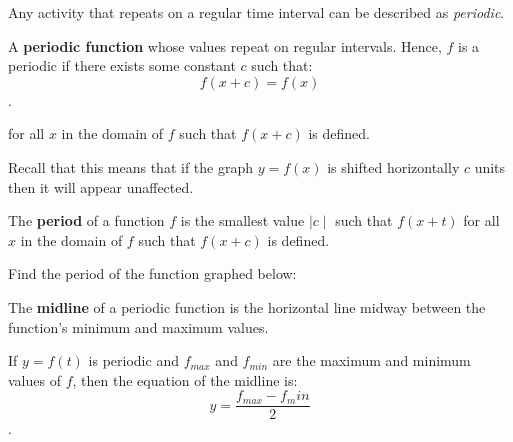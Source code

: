 \label{les_3:introduction_to_periodic_functions}

Any activity that repeats on a regular time interval can be described as
\textit{periodic}.

\begin{definition}
  \label{def:periodic_function}

  A \textbf{periodic function} whose values repeat on regular intervals. Hence,
  $f$ is a periodic if there exists some constant $c$ such that:
  \[ f(x + c) = f(x) \].

  for all $x$ in the domain of $f$ such that $f(x + c)$ is defined.

  Recall that this means that if the graph $y = f(x)$ is shifted horizontally $c$ 
  units then it will appear unaffected.
\end{definition}

\begin{definition}[Period]
  \label{def:period}

  The \textbf{period} of a function $f$ is the smallest value $\mid c \mid$ such
  that $f(x + t)$ for all $x$ in the domain of $f$ such that $f(x + c)$ is
  defined.
\end{definition}

\begin{exc}
  \label{exc:period}

  Find the period of the function graphed below:

  \begin{figure}[H]
    \centering


    \caption{}
    \label{fig:period}
  \end{figure}
\end{exc}

\begin{definition}[Midline]
  \label{def:midline}

  The \textbf{midline} of a periodic function is the horizontal line midway
  between the function's minimum and maximum values.

  If $y = f(t)$ is periodic and $f_{max}$ and $f_{min}$ are the maximum and
  minimum values of $f$, then the equation of the midline is:
  \[ y = \frac{f_{max} - f_min}{2} \].
\end{definition}

